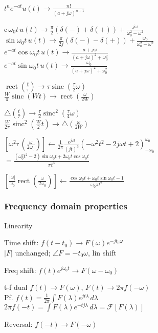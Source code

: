 \documentclass[4pt]{article}
\theoremstyle{definition}
\theoremstyle{definition}
\renewcommand{\c}{\mathrm{c}\,}
\renewcommand{\r}{\mathrm{r}\,}             %
\renewcommand{\o}{\omega}
\newcommand{\ra}{\rightarrow}
\DeclareMathOperator{\rect}{rect}
\DeclareMathOperator{\sinc}{sinc}
\begin{document}
    \(t^n e^{-at} u(t)\ra \frac{n!}{(a+j\o)^{n+1}}\)

    \(\c \o_0 t\, u(t)\ra \frac{\pi}{2}(\delta(-) + \delta(+)) + \frac{j\o}{\o_0^2-\o^2}\)\\       %
    \(\sin \o_0 t\, u(t)\ra \frac{\pi}{2j}(\delta(-) - \delta(+)) + \frac{\o_0}{\o_0^2-\o^2}\)\\
    \(e^{-at}\cos \o_0t\, u(t)\ra \frac{a+j\o}{(a+j\o)^2 + \o_0^2}\)\\
    \(e^{-at}\sin \o_0t\, u(t)\ra \frac{\o_0}{(a+j\o)^2 + \o_0^2}\)           


    $\rect(\frac t {\tau}) \ra \tau \sinc(\frac{\tau}{2}\omega)$\\ 
    $\frac W \pi \sinc(Wt) \ra \rect(\frac{\omega}{2W})$

    \(\triangle (\frac t {\tau}) \ra \frac{\tau}{2} \sinc^2 (\frac{\tau}{4}\omega)\)\\
    \(\frac{W}{2\pi} \sinc^2 (\frac{W}{2}t) \ra \triangle(\frac{\omega}{2W})\)

    \([\o^2 \r(\frac{\o}{2\o_0})] \leftarrow \frac{1}{2\pi} \frac{e^{j\o t}}{(jt)^3}(-\o^2t^2-2j\o t + 2)^{\o_0}_{-\o_0}\)\\
    \(=\frac{(\o_0^2 t^2 - 2)\sin \o_0 t + 2\o_0 t\cos \o_0 t}{\pi t^3}\)\

    \([\frac{|\o|}{\o_0} \rect(\frac{\o}{2\o_0})] \leftarrow \frac{\cos \o_0 t + \o_0 t \sin \o_0 t - 1}{\o_0 \pi t^2}\)
\subsubsection{Frequency domain properties}
    Linearity

    Time shift: \(f(t-t_0) \ra F(\omega) e^{-jt_0\omega}\) \\ %
    $|F|$ unchanged; $\angle F =- t_0\omega$, lin shift

    Freq shift: \(f(t) e^{j\omega_0 t} \ra F(\omega - \omega_0)\)  %

    t-f dual \(f(t) \ra F(\omega)\), \(F(t) \ra 2\pi f(-\omega)\)\\ 
    Pf. \(f(t) = \frac 1 {2\pi} \int F(\lambda) e^{jt\lambda}\, d\lambda\)\\
    \(2\pi f(-t) = \int F(\lambda) e^{-tj\lambda}\, d\lambda = \mathcal{F}[F(\lambda)]\)

    Reversal: \(f(-t)\ra F(-\o)\)
\end{document}
